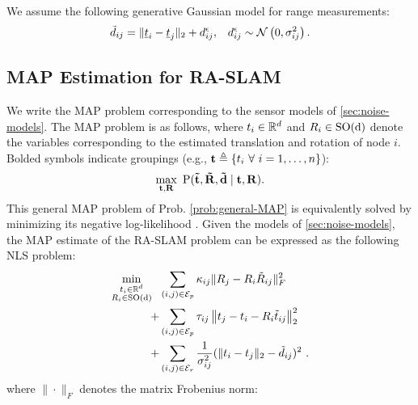 We assume the following generative Gaussian model for range measurements:
\begin{equation}
    \label{eq:range-measurement-model}
    \begin{aligned}
        \tilde{d}_{i j}   & = \lVert \underline{t}_i - \underline{t}_j \rVert_2
        +{d}^{\epsilon}_{i j}, & {d}^{\epsilon}_{i j}                          & \sim \mathcal{N}\left(0, \sigma_{i j}^2 \right). \\
    \end{aligned}
\end{equation}

\subsection{MAP Estimation for RA-SLAM}

We write the MAP problem corresponding to the sensor models of
\cref{sec:noise-models}. The MAP problem is as follows, where $t_i \in
    \mathbb{R}^d$ and $R_i \in \operatorname{{\operatorname{SO}}(d)}$ denote the variables corresponding to the estimated
translation and rotation of node $i$. Bolded symbols indicate groupings (e.g.,
$\textbf{t} \triangleq \{t_i~\forall~i=1,\ldots,n \}$):
\begin{equation}
    \label{prob:general-MAP}
    \begin{array}{r}
        \max\limits_{ \bf t , \bf R } ~ \operatorname{P} ( \bf \tilde{t} , \bf \tilde{R}, \bf \tilde{d} \mid \bf t , \bf R).
    \end{array}
\end{equation}
This general MAP problem of Prob. \ref{prob:general-MAP} is equivalently solved by
minimizing its negative log-likelihood \cite{dellaert2017factor}. Given the
models of \cref{sec:noise-models}, the MAP estimate of the RA-SLAM
problem can be expressed as the following NLS problem:
\begin{equation}
    \label{prob:ra-slam-nls}
    \begin{aligned}
        \min\limits_{\substack{ t_i \in \mathbb{R}^d                                                                                    \\ R_i \in \operatorname{{\operatorname{SO}}(d)}}} ~~
          & \sum\limits_{(i,j) \in \mathcal{E}_{p}} \kappa_{ij} \lVert R_j - R_i \tilde{R}_{ij} \rVert_F^2                        \\
        + & \sum\limits_{(i,j) \in \mathcal{E}_{p}} \tau_{ij} \left \lVert t_j - t_i - R_i \tilde{t}_{ij} \right \rVert_2^2 \\
        + & \sum\limits_{(i,j) \in \mathcal{E}_{r}} \frac{1}{\sigma^2_{ij}} ( \lVert t_i - t_j \rVert_2 - \tilde{d}_{ij})^2        ~ .
    \end{aligned}
\end{equation}
where $\| \cdot \|_F$ denotes the matrix
Frobenius norm:

